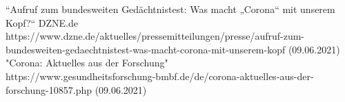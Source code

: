 \documentclass[conference]{IEEEtran}
\begin{document}
\begin{thebibliography}{00}
 “Aufruf zum bundesweiten Gedächtnistest: Was macht „Corona“ mit unserem Kopf?“ DZNE.de \\https://www.dzne.de/aktuelles/pressemitteilungen/presse/aufruf-zum-bundesweiten-gedaechtnistest-was-macht-corona-mit-unserem-kopf (09.06.2021)
 "Corona: Aktuelles aus der Forschung" \\https://www.gesundheitsforschung-bmbf.de/de/corona-aktuelles-aus-der-forschung-10857.php (09.06.2021)
\end{thebibliography}
\vspace{12pt}
\end{document}
